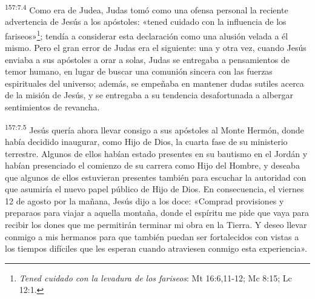 \par
\textsuperscript{157:7.4} Como era de Judea, Judas tomó como una ofensa personal la reciente advertencia de Jesús a los apóstoles: «tened cuidado con la influencia de los fariseos»\footnote{\textit{Tened cuidado con la levadura de los fariseos}: Mt 16:6,11-12; Mc 8:15; Lc 12:1.}; tendía a considerar esta declaración como una alusión velada a él mismo. Pero el gran error de Judas era el siguiente: una y otra vez, cuando Jesús enviaba a sus apóstoles a orar a solas, Judas se entregaba a pensamientos de temor humano, en lugar de buscar una comunión sincera con las fuerzas espirituales del universo; además, se empeñaba en mantener dudas sutiles acerca de la misión de Jesús, y se entregaba a su tendencia desafortunada a albergar sentimientos de revancha.

\par
\textsuperscript{157:7.5} Jesús quería ahora llevar consigo a sus apóstoles al Monte Hermón, donde había decidido inaugurar, como Hijo de Dios, la cuarta fase de su ministerio terrestre. Algunos de ellos habían estado presentes en su bautismo en el Jordán y habían presenciado el comienzo de su carrera como Hijo del Hombre, y deseaba que algunos de ellos estuvieran presentes también para escuchar la autoridad con que asumiría el nuevo papel público de Hijo de Dios. En consecuencia, el viernes 12 de agosto por la mañana, Jesús dijo a los doce: «Comprad provisiones y preparaos para viajar a aquella montaña, donde el espíritu me pide que vaya para recibir los dones que me permitirán terminar mi obra en la Tierra. Y deseo llevar conmigo a mis hermanos para que también puedan ser fortalecidos con vistas a los tiempos difíciles que les esperan cuando atraviesen conmigo esta experiencia».